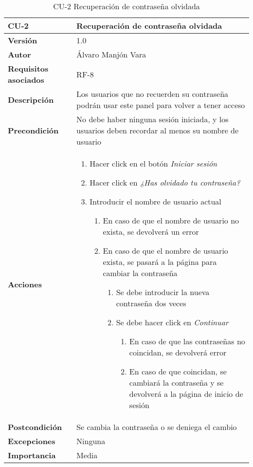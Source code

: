 \begin{table}[htp]
	\centering
	\begin{tabularx}{\linewidth}{ p{} p{} }
		\toprule
		\textbf{CU-2}    & \textbf{Recuperación de contraseña olvidada}\\
		\toprule
		\textbf{Versión}              & 1.0    \\
		\textbf{Autor}                & Álvaro Manjón Vara \\
		\textbf{Requisitos asociados} & RF-8 \\
		\textbf{Descripción}          & Los usuarios que no recuerden su contraseña podrán usar este panel para volver a tener acceso \\
		\textbf{Precondición}         & No debe haber ninguna sesión iniciada, y los usuarios deben recordar al menos su nombre de usuario \\
		\textbf{Acciones}             &
		\begin{enumerate}
			\def\labelenumi{\arabic{enumi}.}
			\tightlist
			\item Hacer click en el botón \textit{Iniciar sesión}
			\item Hacer click en \textit{¿Has olvidado tu contraseña?}
			\item Introducir el nombre de usuario actual
			\begin{enumerate}
  				\item En caso de que el nombre de usuario no exista, se devolverá un error
  				\item En caso de que el nombre de usuario exista, se pasará a la página para cambiar la contraseña
  				\begin{enumerate}
  					\item Se debe introducir la nueva contraseña dos veces
  					\item Se debe hacer click en \textit{Continuar}
  					\begin{enumerate}
  						\item En caso de que las contraseñas no coincidan, se devolverá error
  						\item En caso de que coincidan, se cambiará la contraseña y se devolverá a la página de inicio de sesión
					\end{enumerate}
				\end{enumerate}
			\end{enumerate}
		\end{enumerate} \\
		\textbf{Postcondición}        & Se cambia la contraseña o se deniega el cambio \\
		\textbf{Excepciones}          & Ninguna \\
		\textbf{Importancia}          & Media \\
		\bottomrule
	\end{tabularx}
	\caption{CU-2 Recuperación de contraseña olvidada}
\end{table}
\afterpage{\clearpage}

